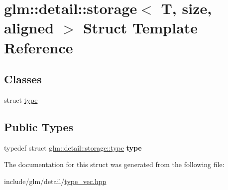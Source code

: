 \hypertarget{structglm_1_1detail_1_1storage}{}\section{glm\+:\+:detail\+:\+:storage$<$ T, size, aligned $>$ Struct Template Reference}
\label{structglm_1_1detail_1_1storage}
\subsection*{Classes}
\begin{DoxyCompactItemize}
\item 
struct \hyperlink{structglm_1_1detail_1_1storage_1_1type}{type}
\end{DoxyCompactItemize}
\subsection*{Public Types}
\begin{DoxyCompactItemize}
\item 
\mbox{\label{structglm_1_1detail_1_1storage_a11188a4949646a1c74aea5181fc8213d}} 
typedef struct \hyperlink{structglm_1_1detail_1_1storage_1_1type}{glm\+::detail\+::storage\+::type} {\bfseries type}
\end{DoxyCompactItemize}


The documentation for this struct was generated from the following file\+:\begin{DoxyCompactItemize}
\item 
include/glm/detail/\hyperlink{type__vec_8hpp}{type\+\_\+vec.\+hpp}\end{DoxyCompactItemize}
